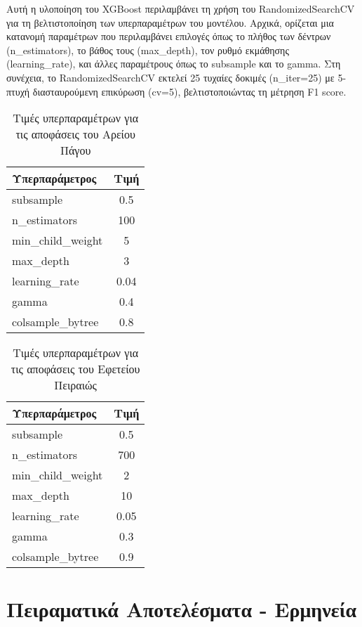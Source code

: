 \documentclass[diploma]{softlab-thesis}
\begin{document}
\begin{enumerate}
\begin{enumerate}
Αυτή η υλοποίηση του XGBoost περιλαμβάνει τη χρήση του RandomizedSearchCV για τη βελτιστοποίηση των υπερπαραμέτρων του μοντέλου. Αρχικά, ορίζεται μια κατανομή παραμέτρων που περιλαμβάνει επιλογές όπως το πλήθος των δέντρων (n\_estimators), το βάθος τους (max\_depth), τον ρυθμό εκμάθησης (learning\_rate), και άλλες παραμέτρους όπως το subsample και το gamma. Στη συνέχεια, το RandomizedSearchCV εκτελεί 25 τυχαίες δοκιμές (n\_iter=25) με 5-πτυχή διασταυρούμενη επικύρωση (cv=5), βελτιστοποιώντας τη μέτρηση F1 score.


\begin{table}[h!]
\centering
\begin{tabular}{|l|c|}
\hline
\rowcolor[HTML]{FFFFFF} 
\textbf{Υπερπαράμετρος}      & \textbf{Τιμή}    \\ \hline
subsample          & 0.5 \\ \hline
n\_estimators          & 100      \\ \hline
min\_child\_weight & 5      \\ \hline
max\_depth & 3     \\ \hline
learning\_rate& 0.04   \\ \hline
gamma          & 0.4 \\ \hline
colsample\_bytree & 0.8    \\ \hline
\end{tabular}
\caption{Τιμές υπερπαραμέτρων για τις αποφάσεις του Αρείου Πάγου}
\end{table}

\begin{table}[h!]
\centering
\begin{tabular}{|l|c|}
\hline
\rowcolor[HTML]{FFFFFF} 
\textbf{Υπερπαράμετρος}      & \textbf{Τιμή}    \\ \hline
subsample          & 0.5 \\ \hline
n\_estimators          & 700     \\ \hline
min\_child\_weight & 2      \\ \hline
max\_depth & 10     \\ \hline
learning\_rate& 0.05   \\ \hline
gamma          & 0.3 \\ \hline
colsample\_bytree & 0.9 \\ \hline
\end{tabular}
\caption{Τιμές υπερπαραμέτρων για τις αποφάσεις του Εφετείου Πειραιώς}
\end{table}

\chapter{Πειραματικά Αποτελέσματα - Ερμηνεία}


\end{enumerate}
\end{enumerate}
\end{document}
